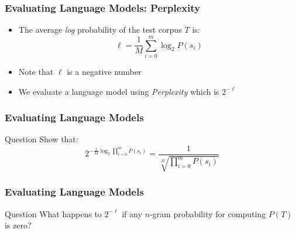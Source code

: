 \begin{frame}
\frametitle{Evaluating Language Models: Perplexity}
\begin{itemize}[<+->]
\item The average {\em log} probability of the test corpus $T$ is:
\[ \ell = \frac{1}{M} \sum_{i=0}^m \log_2 P(s_i) \]
\item Note that $\ell$ is a negative number
\item We evaluate a language model using {\em Perplexity} which is $2^{-\ell}$
\end{itemize}
\end{frame}

\begin{frame}
\frametitle{Evaluating Language Models}
\begin{alertblock}{Question}
Show that:
\[ 2^{- \frac{1}{M} \log_2 \prod_{i=0}^m P(s_i)} = \frac{1}{\sqrt[M]{\prod_{i=0}^m P(s_i)}} \]
\end{alertblock}
\end{frame}

\begin{frame}
\frametitle{Evaluating Language Models}
\begin{alertblock}{Question}
What happens to $2^{- \ell}$ if any $n$-gram probability for computing $P(T)$ is zero?
\end{alertblock}
\end{frame}

